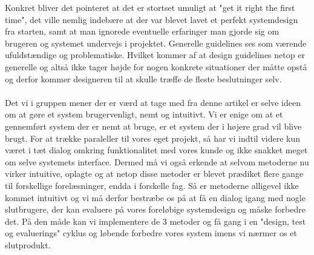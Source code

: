 \documentclass[12pt]{article}
\begin{document}
Konkret bliver det pointeret at det er stortset umuligt at "get it right the first time", det ville nemlig indebære at der var blevet lavet et perfekt systemdesign fra starten, samt at man ignorede eventuelle erfaringer man gjorde sig om brugeren og systemet undervejs i projektet. Generelle guidelines ses som værende ufuldstændige og problematiske. Hvilket kommer af at design guidelines netop er generelle og altså ikke tager højde for nogen konkrete situationer der måtte opstå og derfor kommer designeren til at skulle træffe de fleste beslutninger selv.\\\\
Det vi i gruppen mener der er værd at tage med fra denne artikel er selve ideen om at gøre et system brugervenligt, nemt og intuitivt. Vi er enige om at et gennemført system der er nemt at bruge, er et system der i højere grad vil blive brugt. For at trække paraleller til vores eget projekt, så har vi indtil videre kun været i tæt dialog omkring funktionalitet med vores kunde og ikke snakket meget om selve systemets interface. Dermed må vi også erkende at selvom metoderne nu virker intuitive, oplagte og at netop disse metoder er blevet prædiket flere gange til forskellige forelæsninger, endda i forskelle fag. Så er metoderne alligevel ikke kommet intuitivt og vi må derfor bestræbe os på at få en dialog igang med nogle slutbrugere, der kan evaluere på vores foreløbige systemdesign og måske forbedre det. På den måde kan vi implementere de 3 metoder og få gang i en "design, test og evaluerings" cyklus og løbende forbedre vores system imens vi nærmer os et slutprodukt.\\\\
\end{document}
